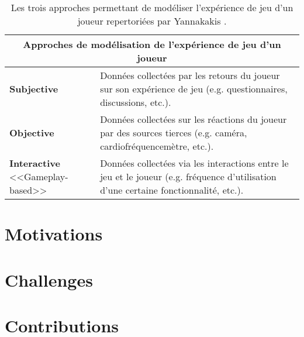 \documentclass[a4paper,11pt]{article}
\begin{document}
      \begin{table}
        \begin{tabularx}{\linewidth}{p{2.2cm} X}
          \hline
            \multicolumn{2}{c}{\textbf{Approches de modélisation de l'expérience de jeu d'un joueur}} \\
          \hline
            \textbf{Subjective} & Données collectées par les retours du joueur sur son expérience de jeu (e.g. questionnaires, discussions, etc.). \\
          \hline
            \textbf{Objective} & Données collectées sur les réactions du joueur par des sources tierces (e.g. caméra, cardiofréquencemètre, etc.). \\
          \hline
            \textbf{Interactive} \footnotesize<<Gameplay-based>> & Données collectées via les interactions entre le jeu et le joueur (e.g. fréquence d'utilisation d'une certaine fonctionnalité, etc.). \\
          \hline
        \end{tabularx}
        \caption{Les trois approches permettant de modéliser l'expérience de jeu d'un joueur repertoriées par Yannakakis \cite{Yannakakis}.}
        \label{table:pems}
      \end{table}

    \section{Motivations}

    \section{Challenges}
      
    \section{Contributions}
\end{document}

